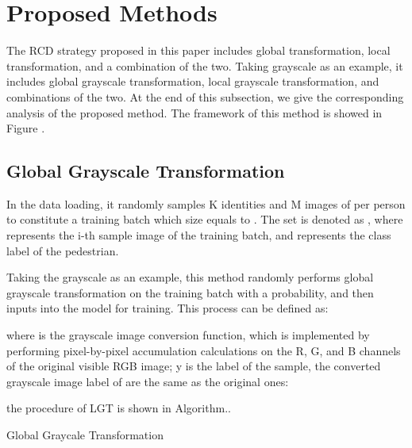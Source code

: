 \documentclass[10pt,twocolumn,letterpaper]{article}
\begin{document}
\section{Proposed Methods}
\label{sec:}
The RCD strategy proposed in this paper includes global transformation, local transformation, and a combination of the two. Taking grayscale as an example, it includes global grayscale transformation, local grayscale transformation, and combinations of the two. At the end of this subsection, we give the corresponding analysis of the proposed method. The framework of this method is showed in Figure .

\subsection{Global Grayscale Transformation}
In the data loading, it randomly samples K identities and M images of per person to constitute a training batch which size equals to . The set is denoted as , where  represents the i-th sample image of the training batch, and  represents the class label of the pedestrian.

Taking the grayscale as an example, this method randomly performs global grayscale transformation on the training batch with a probability, and then inputs into the model for training. This process can be defined as:

where  is the grayscale image conversion function, which is implemented by performing pixel-by-pixel accumulation calculations on the R, G, and B channels of the original visible RGB image; y is the label of the sample, the converted grayscale image label of  are the same as the original ones:

the procedure of LGT is shown in Algorithm..


\begin{algorithm}[t]
	\SetAlgoLined
	\caption{Global Graycale Transformation}\label{algorithm 1}
	
\end{algorithm}
\end{document}
